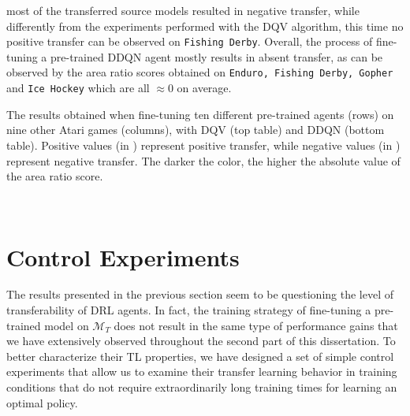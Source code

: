 most of the transferred source models resulted in negative transfer, while differently from the experiments performed with the DQV algorithm, this time no positive transfer can be observed on \texttt{Fishing Derby}. Overall, the process of fine-tuning a pre-trained DDQN agent mostly results in absent transfer, as can be observed by the area ratio scores obtained on \texttt{Enduro, Fishing Derby, Gopher} and \texttt{Ice Hockey} which are all $\approx 0$ on average.  


\begin{table}[t!]
	\caption{The results obtained when fine-tuning ten different pre-trained agents (rows) on nine other Atari games (columns), with DQV (top table) and DDQN (bottom table). Positive values (in ) represent positive transfer, while negative values (in ) represent negative transfer. The darker the color, the higher the absolute value of the area ratio score.} %
	{}
	\label{tab:dqv_res}


        ~\\
	{}
	\label{tab:ddqn_res}
\end{table}




\section{Control Experiments}
\label{sec:control_experiments}
The results presented in the previous section seem to be questioning the level of transferability of DRL agents. In fact, the training strategy of fine-tuning a pre-trained model on $\mathcal{M}_T$ does not result in the same type of performance gains that we have extensively observed throughout the second part of this dissertation. To better characterize their TL properties, we have designed a set of simple control experiments that allow us to examine their transfer learning behavior in training conditions that do not require extraordinarily long training times for learning an optimal policy.   

